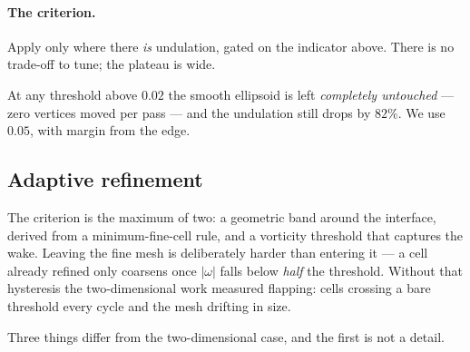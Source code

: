 \paragraph{The criterion.} Apply only where there \emph{is} undulation, gated on
the indicator above. There is no trade-off to tune; the plateau is wide.

\begin{table}[htbp]
\centering
\caption{Threshold sweep. The second column must stay far below $0.0023$; the
last must stay high.}
\label{tab:threshold}
\small
{}
\end{table}

At any threshold above $0.02$ the smooth ellipsoid is left \emph{completely
untouched} --- zero vertices moved per pass --- and the undulation still drops
by $82\%$. We use $0.05$, with margin from the edge.


\subsection{Adaptive refinement}
\label{sec:amr}


The criterion is the maximum of two: a geometric band around the interface,
derived from a minimum-fine-cell rule, and a vorticity threshold that captures
the wake. Leaving the fine mesh is deliberately harder than entering it --- a
cell already refined only coarsens once $|\omega|$ falls below \emph{half} the
threshold. Without that hysteresis the two-dimensional work measured flapping:
cells crossing a bare threshold every cycle and the mesh drifting in size.

Three things differ from the two-dimensional case, and the first is not a
detail.

